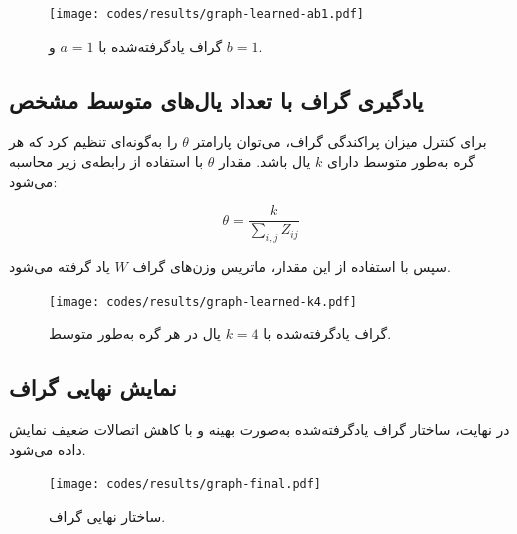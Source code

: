\documentclass[10pt,twocolumn,a4paper]{article}
\begin{document}
	\begin{latin}
		
	\end{latin}
	
	\begin{figure}[H]
		\centering
		\texttt{[image: codes/results/graph-learned-ab1.pdf]}
		\caption{گراف یادگرفته‌شده با \( a = 1 \) و \( b = 1 \).}
		\label{fig:graph-learned-ab1}
	\end{figure}
	
	\subsection{یادگیری گراف با تعداد یال‌های متوسط مشخص}
	برای کنترل میزان پراکندگی گراف، می‌توان پارامتر \( \theta \) را به‌گونه‌ای تنظیم کرد که هر گره به‌طور متوسط دارای \( k \) یال باشد. مقدار \( \theta \) با استفاده از رابطه‌ی زیر محاسبه می‌شود:
	
	\[
	\theta = \frac{k}{\sum_{i,j} Z_{ij}}
	\]
	
	سپس با استفاده از این مقدار، ماتریس وزن‌های گراف \( W \) یاد گرفته می‌شود.
	
	\begin{latin}
		
	\end{latin}
	
	
	\begin{figure}[H]
		\centering
		\texttt{[image: codes/results/graph-learned-k4.pdf]}
		\caption{گراف یادگرفته‌شده با \( k = 4 \) یال در هر گره به‌طور متوسط.}
		\label{fig:graph-learned-k4}
	\end{figure}
	
	\subsection{نمایش نهایی گراف}
	در نهایت، ساختار گراف یادگرفته‌شده به‌صورت بهینه و با کاهش اتصالات ضعیف نمایش داده می‌شود.
	
	\begin{latin}
		
	\end{latin}
	
	
	\begin{figure}[H]
		\centering
		\texttt{[image: codes/results/graph-final.pdf]}
		\caption{ساختار نهایی گراف.}
		\label{fig:graph-final}
	\end{figure}
	
    	

    
    
    
	\nocite{*}
\end{document}
